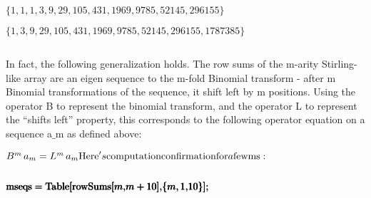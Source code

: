 \documentclass{article}
\begin{document}
\begin{doublespace}
\noindent\(\{1,1,1,3,9,29,105,431,1969,9785,52145,296155\}\)
\end{doublespace}

\begin{doublespace}
\noindent\(\{1,3,9,29,105,431,1969,9785,52145,296155,1787385\}\)
\end{doublespace}

\begin{doublespace}
\noindent\(\pmb{\text{}}\)
\end{doublespace}

In fact, the following generalization holds. The row sums of the m-arity Stirling-like array are an eigen sequence to the m-fold Binomial transform
- after m Binomial transformations of the sequence, it shift left by m positions. Using the operator B to represent the binomial transform, and the
operator L to represent the {``}shifts left{''} property, this corresponds to the following operator equation on a sequence a$\_$m as defined above:

\(B^m\, a_m= L^m\, a_m\\
\\
\\
\\
\text{Here}'s \\
\text{computati}\\
\text{on} \\
\text{confirmat}\\
\text{ion} \text{for} \\
a \text{few} \text{ms}:\)

\(\text{}\)

\begin{doublespace}
\noindent\(\pmb{\text{mseqs} = }\\
\pmb{\text{Table}[}\\
\pmb{\text{rowSums}[}\\
\pmb{m,}\\
\pmb{m+10], }\\
\pmb{\{m, 1,}\\
\pmb{10\}];}\)
\end{doublespace}
\end{document}
